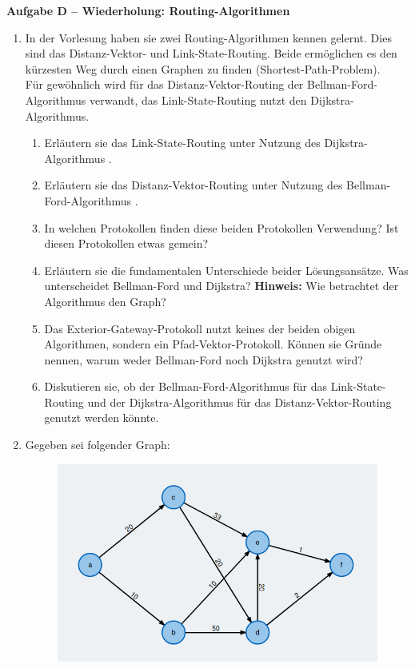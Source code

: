 \documentclass[paper=a4,fontsize=11pt]{scrartcl}%
\numberwithin{equation}{section}
\begin{document}
\begin{center}\Large{\textbf{Aufgabe D -- Wiederholung: Routing-Algorithmen}}\end{center}\vskip0.2in
\begin{enumerate}
	\item In der Vorlesung haben sie zwei Routing-Algorithmen kennen gelernt. Dies sind das Distanz-Vektor- und Link-State-Routing. Beide ermöglichen es den kürzesten Weg durch einen Graphen zu finden (Shortest-Path-Problem).\\
	Für gewöhnlich wird für das Distanz-Vektor-Routing der Bellman-Ford-Algorithmus verwandt, das Link-State-Routing nutzt den Dijkstra-Algorithmus. \cite[S. 363ff]{Kurose2012}
	\begin{enumerate}
		\item Erläutern sie das Link-State-Routing unter Nutzung des Dijkstra-Algorithmus \cite[S. 366]{Kurose2012}.
		\item Erläutern sie das Distanz-Vektor-Routing unter Nutzung des Bellman-Ford-Algorithmus \cite[S. 371]{Kurose2012}.
		\item In welchen Protokollen finden diese beiden Protokollen Verwendung? Ist diesen Protokollen etwas gemein?
		\item Erläutern sie die fundamentalen Unterschiede beider Lösungsansätze. Was unterscheidet Bellman-Ford und Dijkstra? \textbf{Hinweis:} Wie betrachtet der Algorithmus den Graph?
		\item Das Exterior-Gateway-Protokoll nutzt keines der beiden obigen Algorithmen, sondern ein Pfad-Vektor-Protokoll. Können sie Gründe nennen, warum weder Bellman-Ford noch Dijkstra genutzt wird?
		\item Diskutieren sie, ob der Bellman-Ford-Algorithmus für das Link-State-Routing und der Dijkstra-Algorithmus für das Distanz-Vektor-Routing genutzt werden könnte.
	\end{enumerate}
	\item Gegeben sei folgender Graph:
	\begin{figure}[H]
		\centering
		\includegraphics[scale=0.4]{dijkstra_example}

\end{figure}
\end{enumerate}
\end{document}
